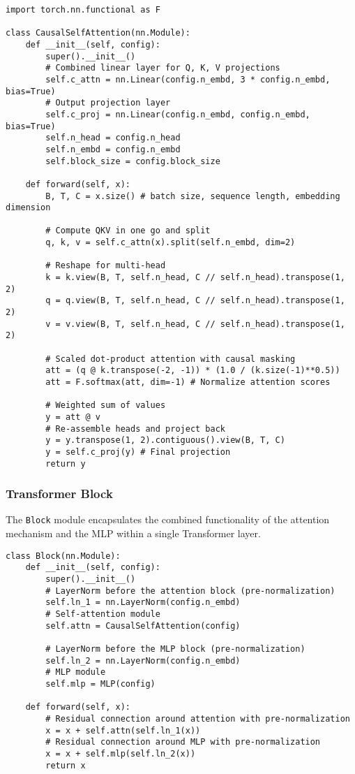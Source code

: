 \begin{lstlisting}[caption={Multi-Headed Attention (Simplified)}]
import torch.nn.functional as F

class CausalSelfAttention(nn.Module):
    def __init__(self, config):
        super().__init__()
        # Combined linear layer for Q, K, V projections
        self.c_attn = nn.Linear(config.n_embd, 3 * config.n_embd, bias=True)
        # Output projection layer
        self.c_proj = nn.Linear(config.n_embd, config.n_embd, bias=True)
        self.n_head = config.n_head
        self.n_embd = config.n_embd
        self.block_size = config.block_size

    def forward(self, x):
        B, T, C = x.size() # batch size, sequence length, embedding dimension
        
        # Compute QKV in one go and split
        q, k, v = self.c_attn(x).split(self.n_embd, dim=2)
        
        # Reshape for multi-head
        k = k.view(B, T, self.n_head, C // self.n_head).transpose(1, 2)
        q = q.view(B, T, self.n_head, C // self.n_head).transpose(1, 2)
        v = v.view(B, T, self.n_head, C // self.n_head).transpose(1, 2)

        # Scaled dot-product attention with causal masking
        att = (q @ k.transpose(-2, -1)) * (1.0 / (k.size(-1)**0.5))
        att = F.softmax(att, dim=-1) # Normalize attention scores

        # Weighted sum of values
        y = att @ v
        # Re-assemble heads and project back
        y = y.transpose(1, 2).contiguous().view(B, T, C)
        y = self.c_proj(y) # Final projection
        return y
\end{lstlisting}

\subsubsection{Transformer Block}
The \texttt{Block} module encapsulates the combined functionality of the attention mechanism and the MLP within a single Transformer layer.

\begin{lstlisting}[caption={Transformer Block Structure}]
class Block(nn.Module):
    def __init__(self, config):
        super().__init__()
        # LayerNorm before the attention block (pre-normalization)
        self.ln_1 = nn.LayerNorm(config.n_embd)
        # Self-attention module
        self.attn = CausalSelfAttention(config)

        # LayerNorm before the MLP block (pre-normalization)
        self.ln_2 = nn.LayerNorm(config.n_embd)
        # MLP module
        self.mlp = MLP(config)

    def forward(self, x):
        # Residual connection around attention with pre-normalization
        x = x + self.attn(self.ln_1(x))
        # Residual connection around MLP with pre-normalization
        x = x + self.mlp(self.ln_2(x))
        return x
\end{lstlisting}

